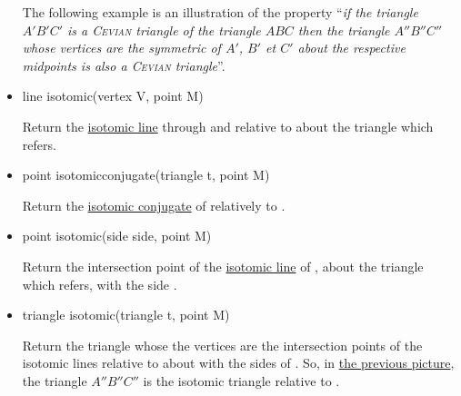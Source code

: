 \documentclass[pdftex]{article}
\begin{document}
\begin{itemize}
  The following example is an illustration of the property ``\emph{if the
    triangle  $A'B'C'$ is a \textsc{Cevian} triangle of the triangle $ABC$
    then the triangle  $A''B''C''$ whose vertices are the symmetric of
    $A'$, $B'$ et $C'$  about the respective midpoints is also
    a  \hypertarget{cevian_ex}{\textsc{Cevian}} triangle}''.
\item {}
  \begin{Vcolor}
    line isotomic(vertex V, point M)
  \end{Vcolor}
  Return the
  \href{http://mathworld.wolfram.com/IsotomicLines.html}{isotomic
    line} through  and relative to  about the
  triangle which  refers.
\item {}
  \begin{Vcolor}
    point isotomicconjugate(triangle t, point M)
  \end{Vcolor}
  Return the
  \href{http://mathworld.wolfram.com/IsotomicLines.html}{isotomic
    conjugate} of  relatively to .
\item {}
  \begin{Vcolor}
    point isotomic(side side, point M)
  \end{Vcolor}
  Return the intersection point of the
  \href{http://mathworld.wolfram.com/IsotomicLines.html}{isotomic
    line} of , about the triangle
  which  refers, with the side .
\item {}
  \begin{Vcolor}
    triangle isotomic(triangle t, point M)
  \end{Vcolor}
  Return the triangle whose the vertices are the intersection points of
  the isotomic lines relative to  about  with the sides
  of . So, in \href{#cevian_ex}{the previous picture}, the
  triangle $A''B''C''$ is the isotomic triangle relative to .


\end{itemize}
\end{document}

